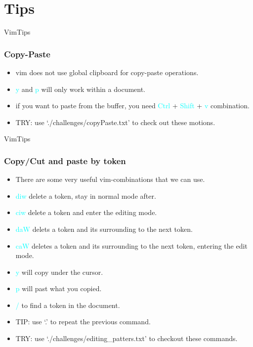 \documentclass{beamer}
\newcommand{\highlight}[1]{\textcolor{cyan}{\textsf{#1}}}
\begin{document}
\section{Tips}
\begin{frame}{VimTips}
    \frametitle{Copy-Paste}
    \begin{itemize}
        \item vim does not use global clipboard for copy-paste operations.
        \item \highlight{y} and \highlight{p} will only work within a document.
        \item if you want to paste from the buffer, you need \highlight{Ctrl} + \highlight{Shift} + \highlight{v} combination.
        \item TRY: use `./challenges/copyPaste.txt' to check out these motions.
    \end{itemize}
\end{frame}

\begin{frame}{VimTips}
    \frametitle{Copy/Cut and paste by token}
    \begin{itemize}
        \item There are some very useful vim-combinations that we can use.
        \item \highlight{diw} delete a token, stay in normal mode after.
        \item \highlight{ciw} delete a token and enter the editing mode.
        \item \highlight{daW} delets a token and its surrounding to the next token.
        \item \highlight{caW} deletes a token and its surrounding to the next token, entering the edit mode.
        \item \highlight{y} will copy under the cursor.
        \item \highlight{p} will past what you copied.
        \item \highlight{/} to find a token in the document.
        \item TIP: use `.' to repeat the previous command.
        \item TRY: use `./challenges/editing\_patters.txt' to checkout these commands.
    \end{itemize}
\end{frame}
\end{document}
